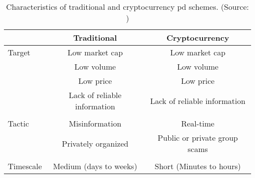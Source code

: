 \begin{table}[ht]
    \centering
    \begin{tabular}{l c c}
    \hline
     &\textbf{Traditional} & \textbf{Cryptocurrency}\\
    \hline
     Target   & Low market cap & Low market cap \\
              & Low volume     & Low volume \\
              & Low price      & Low price \\
              & Lack of reliable information & Lack of reliable information\\
              \\
    Tactic    & Misinformation & Real-time\\
              & Privately organized & Public or private group scams\\
              \\
    Timescale & Medium (days to weeks) & Short (Minutes to hours)\\
    \hline
    \end{tabular}
    \caption{Characteristics of traditional and cryptocurrency \ac{pd} schemes. (Source: \cite{P&D_to_the_moon})}
    \label{tab:pd_characteristics}
\end{table}
